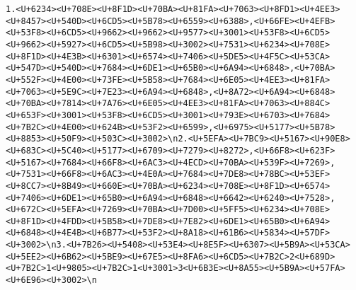 \documentclass[
]{article}
\begin{document}
\begin{verbatim}
1.<U+6234><U+708E><U+8F1D><U+70BA><U+81FA><U+7063><U+8FD1><U+4EE3><U+8457><U+540D><U+6CD5><U+5B78><U+6559><U+6388>,<U+66FE><U+4EFB><U+53F8><U+6CD5><U+9662><U+9662><U+9577><U+3001><U+53F8><U+6CD5><U+9662><U+5927><U+6CD5><U+5B98><U+3002><U+7531><U+6234><U+708E><U+8F1D><U+4E3B><U+6301><U+6574><U+7406><U+5DE5><U+4F5C><U+53CA><U+547D><U+540D><U+7684><U+6DE1><U+65B0><U+6A94><U+6848>,<U+70BA><U+552F><U+4E00><U+73FE><U+5B58><U+7684><U+6E05><U+4EE3><U+81FA><U+7063><U+5E9C><U+7E23><U+6A94><U+6848>,<U+8A72><U+6A94><U+6848><U+70BA><U+7814><U+7A76><U+6E05><U+4EE3><U+81FA><U+7063><U+884C><U+653F><U+3001><U+53F8><U+6CD5><U+3001><U+793E><U+6703><U+7684><U+7B2C><U+4E00><U+624B><U+53F2><U+6599>,<U+6975><U+5177><U+5B78><U+8853><U+50F9><U+503C><U+3002>\n2.<U+5EFA><U+7BC9><U+5167><U+90E8><U+683C><U+5C40><U+5177><U+6709><U+7279><U+8272>,<U+66F8><U+623F><U+5167><U+7684><U+66F8><U+6AC3><U+4ECD><U+70BA><U+539F><U+7269>,<U+7531><U+66F8><U+6AC3><U+4E0A><U+7684><U+7DE8><U+78BC><U+53EF><U+8CC7><U+8B49><U+660E><U+70BA><U+6234><U+708E><U+8F1D><U+6574><U+7406><U+6DE1><U+65B0><U+6A94><U+6848><U+6642><U+6240><U+7528>,<U+672C><U+5EFA><U+7269><U+70BA><U+7D00><U+5FF5><U+6234><U+708E><U+8F1D><U+4FDD><U+5B58><U+7DE8><U+7E82><U+6DE1><U+65B0><U+6A94><U+6848><U+4E4B><U+6B77><U+53F2><U+8A18><U+61B6><U+5834><U+57DF><U+3002>\n3.<U+7B26><U+5408><U+53E4><U+8E5F><U+6307><U+5B9A><U+53CA><U+5EE2><U+6B62><U+5BE9><U+67E5><U+8FA6><U+6CD5><U+7B2C>2<U+689D><U+7B2C>1<U+9805><U+7B2C>1<U+3001>3<U+6B3E><U+8A55><U+5B9A><U+57FA><U+6E96><U+3002>\n

\end{verbatim}
\end{document}
